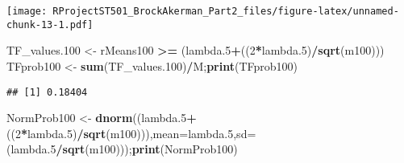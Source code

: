 \documentclass[
]{article}
\newenvironment{Shaded}{\begin{snugshade}}{\end{snugshade}}
\newcommand{\DataTypeTok}[1]{\textcolor[rgb]{0.13,0.29,0.53}{#1}}
\newcommand{\DecValTok}[1]{\textcolor[rgb]{0.00,0.00,0.81}{#1}}
\newcommand{\FloatTok}[1]{\textcolor[rgb]{0.00,0.00,0.81}{#1}}
\newcommand{\KeywordTok}[1]{\textcolor[rgb]{0.13,0.29,0.53}{\textbf{#1}}}
\newcommand{\NormalTok}[1]{#1}
\newcommand{\OperatorTok}[1]{\textcolor[rgb]{0.81,0.36,0.00}{\textbf{#1}}}
\newcommand{\OtherTok}[1]{\textcolor[rgb]{0.56,0.35,0.01}{#1}}
\newcommand{\StringTok}[1]{\textcolor[rgb]{0.31,0.60,0.02}{#1}}
\begin{document}
\begin{Shaded}
\end{Shaded}

\texttt{[image: RProjectST501\_BrockAkerman\_Part2\_files/figure-latex/unnamed-chunk-13-1.pdf]}

\begin{Shaded}
\begin{Highlighting}[]
\NormalTok{TF_values}\FloatTok{.100}\NormalTok{ <-}\StringTok{ }\NormalTok{rMeans100 }\OperatorTok{>=}\StringTok{ }\NormalTok{(lambda}\FloatTok{.5}\OperatorTok{+}\NormalTok{((}\DecValTok{2}\OperatorTok{*}\NormalTok{lambda}\FloatTok{.5}\NormalTok{)}\OperatorTok{/}\KeywordTok{sqrt}\NormalTok{(m100)))}
\NormalTok{TFprob100 <-}\StringTok{ }\KeywordTok{sum}\NormalTok{(TF_values}\FloatTok{.100}\NormalTok{)}\OperatorTok{/}\NormalTok{M;}\KeywordTok{print}\NormalTok{(TFprob100)}
\end{Highlighting}
\end{Shaded}

\begin{verbatim}
## [1] 0.18404
\end{verbatim}

\begin{Shaded}
\begin{Highlighting}[]
\NormalTok{NormProb100 <-}\StringTok{ }\KeywordTok{dnorm}\NormalTok{((lambda}\FloatTok{.5}\OperatorTok{+}\NormalTok{((}\DecValTok{2}\OperatorTok{*}\NormalTok{lambda}\FloatTok{.5}\NormalTok{)}\OperatorTok{/}\KeywordTok{sqrt}\NormalTok{(m100))),}\DataTypeTok{mean=}\NormalTok{lambda}\FloatTok{.5}\NormalTok{,}\DataTypeTok{sd=}\NormalTok{(lambda}\FloatTok{.5}\OperatorTok{/}\KeywordTok{sqrt}\NormalTok{(m100)));}\KeywordTok{print}\NormalTok{(NormProb100)}
\end{Highlighting}
\end{Shaded}
\end{document}
